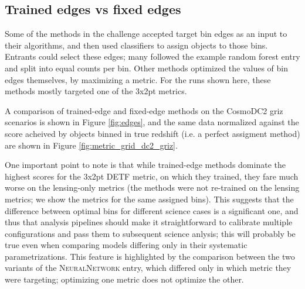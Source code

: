 \documentclass[twocolumn,twocolappendix]{aastex63}
\begin{document}
\subsection{Trained edges vs fixed edges}\label{sec:train-vs-fix}

Some of the methods in the challenge accepted target bin edges as an input to their algorithms,
and then used classifiers to assign objects to those bins.  Entrants could select these edges; many followed the example random forest entry and split into equal counts per bin. Other methods optimized the values
of bin edges themselves, by maximizing a metric.  For the runs shown here, these methods mostly
targeted one of the 3x2pt metrics.

A comparison of trained-edge and fixed-edge methods on the CosmoDC2 griz scenarios
is shown in Figure \ref{fig:edges}, and the same data normalized against the score acheived
by objects binned in true redshift (i.e. a perfect assigment method) are shown in Figure \ref{fig:metric_grid_dc2_griz}.

One important point to note is that while trained-edge
methods dominate the highest scores for the 3x2pt DETF metric, on which they trained, they
fare much worse on the lensing-only metrics (the methods were not re-trained on the lensing metrics;
we show the metrics for the same assigned bins).  This suggests that the difference between
optimal bins for different science cases is a significant one, and thus that analysis pipelines
should make it straightforward to calibrate multiple configurations and pass them to
subsequent science anlysis; this will probably be true even when comparing models
differing only in their systematic parametrizations.  
This feature is highlighted by the comparison between the two variants
of the \textsc{NeuralNetwork} entry, which differed only in which metric they were targeting;
optimizing one metric does not optimize the other.
\end{document}
